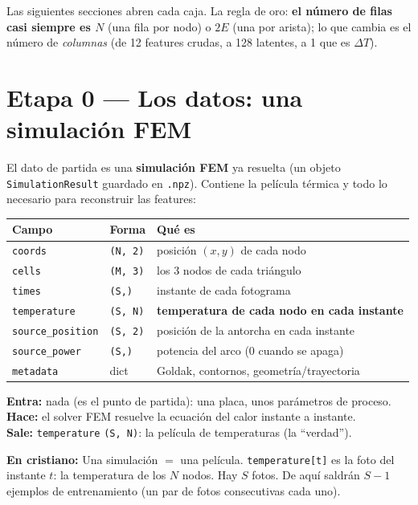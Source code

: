 \documentclass[11pt]{article}
\newcommand{\shp}[1]{{\color{shapecol}\texttt{(#1)}}}   %
\theoremstyle{definition}
\newcommand{\dummies}[1]{%
  \par\smallskip\noindent
  \colorbox{yellow!18}{\parbox{\dimexpr\linewidth-2\fboxsep}{%
  \small\textbf{En cristiano:} #1}}\par\smallskip}
\newcommand{\io}[3]{%
  \par\smallskip\noindent
  \colorbox{blue!6}{\parbox{\dimexpr\linewidth-2\fboxsep}{\small
  \textbf{Entra:} #1 \\ \textbf{Hace:} #2 \\ \textbf{Sale:} #3}}\par\smallskip}
\begin{document}
Las siguientes secciones abren cada caja. La regla de oro: \textbf{el número de
filas casi siempre es $N$} (una fila por nodo) o $2E$ (una por arista); lo que cambia
es el número de \emph{columnas} (de 12 features crudas, a 128 latentes, a 1 que es
$\Delta T$).

\section{Etapa 0 — Los datos: una simulación FEM}
\label{sec:datos}

El dato de partida es una \textbf{simulación FEM} ya resuelta (un objeto
\texttt{SimulationResult} guardado en \texttt{.npz}). Contiene la película térmica y
todo lo necesario para reconstruir las features:

\begin{center}\small
\begin{tabular}{@{}lll@{}}
\toprule
Campo & Forma & Qué es \\
\midrule
\texttt{coords}          & \shp{N, 2}  & posición $(x,y)$ de cada nodo \\
\texttt{cells}           & \shp{M, 3}  & los 3 nodos de cada triángulo \\
\texttt{times}           & \shp{S,}    & instante de cada fotograma \\
\texttt{temperature}     & \shp{S, N}  & \textbf{temperatura de cada nodo en cada instante} \\
\texttt{source\_position}& \shp{S, 2}  & posición de la antorcha en cada instante \\
\texttt{source\_power}   & \shp{S,}    & potencia del arco (0 cuando se apaga) \\
\texttt{metadata}        & dict        & Goldak, contornos, geometría/trayectoria \\
\bottomrule
\end{tabular}
\end{center}

\io{nada (es el punto de partida): una placa, unos parámetros de proceso.}
{el solver FEM resuelve la ecuación del calor instante a instante.}
{\texttt{temperature} \shp{S, N}: la película de temperaturas (la ``verdad'').}

\dummies{Una simulación $=$ una película. \texttt{temperature[t]} es la foto del
instante $t$: la temperatura de los $N$ nodos. Hay $S$ fotos. De aquí saldrán
$S{-}1$ ejemplos de entrenamiento (un par de fotos consecutivas cada uno).}
\end{document}
